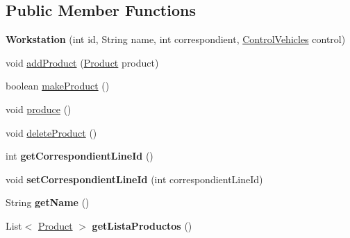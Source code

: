\subsection*{Public Member Functions}
\begin{DoxyCompactItemize}
\item 
\mbox{\label{classmondragon_1_1edu_1_1clases_1_1_workstation_a87c6f669c2383a48b6d58ad0a3d2cd02}} 
{\bfseries Workstation} (int id, String name, int correspondient, \mbox{\hyperlink{classmondragon_1_1edu_1_1control_1_1_control_vehicles}{Control\+Vehicles}} control)
\item 
void \mbox{\hyperlink{classmondragon_1_1edu_1_1clases_1_1_workstation_a1b7c217e9f4bb3c5879f937d1f47bbb0}{add\+Product}} (\mbox{\hyperlink{classmondragon_1_1edu_1_1clases_1_1_product}{Product}} product)
\item 
boolean \mbox{\hyperlink{classmondragon_1_1edu_1_1clases_1_1_workstation_ae95c8dcf4c2af36a78e6d0c7627114a5}{make\+Product}} ()
\item 
void \mbox{\hyperlink{classmondragon_1_1edu_1_1clases_1_1_workstation_a574730f7c7ff1e429e7d25104eefac42}{produce}} ()
\item 
void \mbox{\hyperlink{classmondragon_1_1edu_1_1clases_1_1_workstation_a00808df804a59149feaa317c146bb5d7}{delete\+Product}} ()
\item 
\mbox{\label{classmondragon_1_1edu_1_1clases_1_1_workstation_a1444fb62bfbde01ac7946d2c0216bfaa}} 
int {\bfseries get\+Correspondient\+Line\+Id} ()
\item 
\mbox{\label{classmondragon_1_1edu_1_1clases_1_1_workstation_a4353eab8f54439b094a89b8253d3d922}} 
void {\bfseries set\+Correspondient\+Line\+Id} (int correspondient\+Line\+Id)
\item 
\mbox{\label{classmondragon_1_1edu_1_1clases_1_1_workstation_af1c3c1cbe367606a769d4c8fb12c08a2}} 
String {\bfseries get\+Name} ()
\item 
\mbox{\label{classmondragon_1_1edu_1_1clases_1_1_workstation_a35d1537f5eb642f2b9e0d9ba795ea509}} 
List$<$ \mbox{\hyperlink{classmondragon_1_1edu_1_1clases_1_1_product}{Product}} $>$ {\bfseries get\+Lista\+Productos} ()

\end{DoxyCompactItemize}
